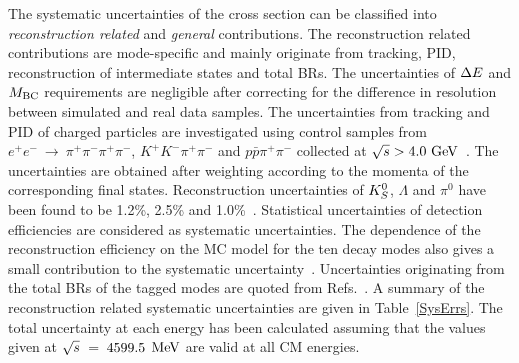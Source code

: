 \documentclass[twocolumn,showpacs,superscriptaddress,amsmath,amssymb]{revtex4-1}
\begin{document}
The systematic uncertainties of the cross section can be classified into \textit{reconstruction related} and \textit{general} contributions. The reconstruction related contributions are mode-specific and mainly originate from tracking, PID, reconstruction of intermediate states and total BRs. The uncertainties of $\Delta E$ and $M_{\textrm{BC}}$ requirements are negligible after correcting for the difference in resolution between simulated and real data samples. The uncertainties from tracking and PID of charged particles are investigated using control samples from $e^{+}e^{-}~\rightarrow~\pi^{+}\pi^{-}\pi^{+}\pi^{-}$, $K^{+}K^{-}\pi^{+}\pi^{-}$ and $p\bar{p}\pi^{+}\pi^{-}$ collected at $\sqrt{s} > 4.0~\mathrm{GeV}$~\cite{BAM0216}. The uncertainties are obtained after weighting according to the momenta of the corresponding final states. Reconstruction uncertainties of $K_{S}^{0}$, $\Lambda$ and $\pi^{0}$ have been found to be 1.2\%, 2.5\% and 1.0\%~\cite{BAM0162}. Statistical uncertainties of detection efficiencies are considered as systematic uncertainties. The dependence of the reconstruction efficiency on the MC model for the ten decay modes also gives a small contribution to the systematic uncertainty~\cite{BAM0162}. Uncertainties originating from the total BRs of the tagged modes are quoted from Refs.~\cite{BAM0162,PDG}. A summary of the reconstruction related systematic uncertainties are given in Table~\ref{SysErrs}. The total uncertainty at each energy has been calculated assuming that the values given at $\sqrt{s}$~=~$4599.5$ $\mathrm{MeV}$ are valid at all CM energies.
\end{document}
